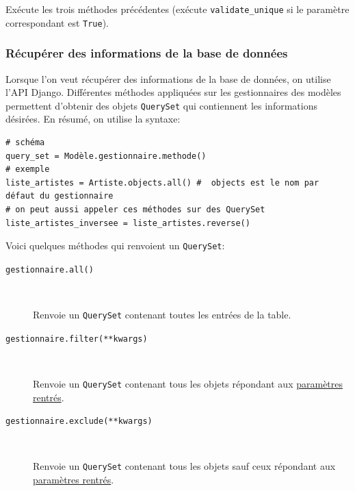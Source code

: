 \documentclass[a4paper, 10pt]{article}
\begin{document}
{\begin{description}
    Exécute les trois méthodes précédentes (exécute \texttt{validate\_unique} si le paramètre correspondant est \texttt{True}).
\end{description}

\subsubsection{Récupérer des informations de la base de données}
Lorsque  l'on veut récupérer des informations de la base de données, on utilise l'API Django. Différentes méthodes appliquées sur les gestionnaires des modèles permettent d'obtenir des objets \texttt{QuerySet} qui contiennent les informations désirées. En résumé, on utilise la syntaxe:
\begin{verbatim}
# schéma
query_set = Modèle.gestionnaire.methode()
# exemple
liste_artistes = Artiste.objects.all() #  objects est le nom par défaut du gestionnaire
# on peut aussi appeler ces méthodes sur des QuerySet
liste_artistes_inversee = liste_artistes.reverse()
\end{verbatim}
 Voici quelques méthodes qui renvoient un \texttt{QuerySet}:

\begin{description}
    \item[\texttt{gestionnaire.all()}]~

    Renvoie un \texttt{QuerySet} contenant toutes les entrées de la table.

    \item[\texttt{gestionnaire.filter(**kwargs)}]~

    Renvoie un \texttt{QuerySet} contenant tous les objets répondant aux \href{https://docs.djangoproject.com/fr/2.0/ref/models/querysets/#field-lookups}{paramètres rentrés}.

    \item[\texttt{gestionnaire.exclude(**kwargs)}]~

    Renvoie un \texttt{QuerySet} contenant tous les objets sauf ceux répondant aux \href{https://docs.djangoproject.com/fr/2.0/ref/models/querysets/#field-lookups}{paramètres rentrés}.


\end{description}}
\end{document}
